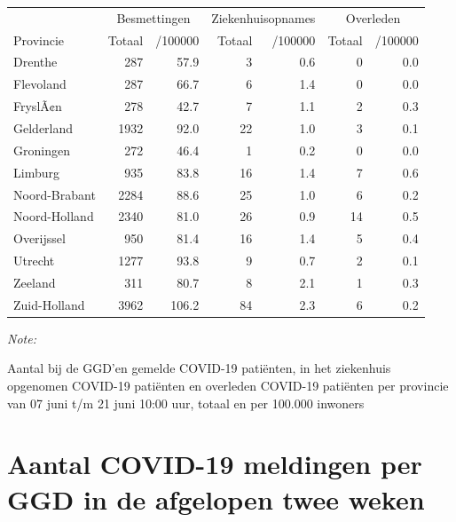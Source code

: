 \documentclass[
  english,
  man,floatsintext]{apa6}
\begin{document}
\begin{table}
\centering
\begin{threeparttable}
\begin{tabular}{lrrrrrr}
\toprule
\multicolumn{1}{c}{ } & \multicolumn{2}{c}{Besmettingen} & \multicolumn{2}{c}{Ziekenhuisopnames} & \multicolumn{2}{c}{Overleden} \\
\cmidrule(l{3pt}r{3pt}){2-3} \cmidrule(l{3pt}r{3pt}){4-5} \cmidrule(l{3pt}r{3pt}){6-7}
Provincie & Totaal & /100000 & Totaal & /100000 & Totaal & /100000\\
\midrule
Drenthe & 287 & 57.9 & 3 & 0.6 & 0 & 0.0\\
Flevoland & 287 & 66.7 & 6 & 1.4 & 0 & 0.0\\
FryslÃ¢n & 278 & 42.7 & 7 & 1.1 & 2 & 0.3\\
Gelderland & 1932 & 92.0 & 22 & 1.0 & 3 & 0.1\\
Groningen & 272 & 46.4 & 1 & 0.2 & 0 & 0.0\\
Limburg & 935 & 83.8 & 16 & 1.4 & 7 & 0.6\\
Noord-Brabant & 2284 & 88.6 & 25 & 1.0 & 6 & 0.2\\
Noord-Holland & 2340 & 81.0 & 26 & 0.9 & 14 & 0.5\\
Overijssel & 950 & 81.4 & 16 & 1.4 & 5 & 0.4\\
Utrecht & 1277 & 93.8 & 9 & 0.7 & 2 & 0.1\\
Zeeland & 311 & 80.7 & 8 & 2.1 & 1 & 0.3\\
Zuid-Holland & 3962 & 106.2 & 84 & 2.3 & 6 & 0.2\\
\bottomrule
\end{tabular}
\begin{tablenotes}
\item \textit{Note: } 
\item Aantal bij de GGD’en gemelde COVID-19 patiënten, in het ziekenhuis opgenomen COVID-19 patiënten en overleden COVID-19 patiënten per provincie van 07 juni t/m 21 juni 10:00 uur, totaal en per 100.000 inwoners
\end{tablenotes}
\end{threeparttable}
\end{table}

\newpage

\hypertarget{aantal-covid-19-meldingen-per-ggd-in-de-afgelopen-twee-weken}{%
\section{Aantal COVID-19 meldingen per GGD in de afgelopen twee weken}\label{aantal-covid-19-meldingen-per-ggd-in-de-afgelopen-twee-weken}}
\end{document}
